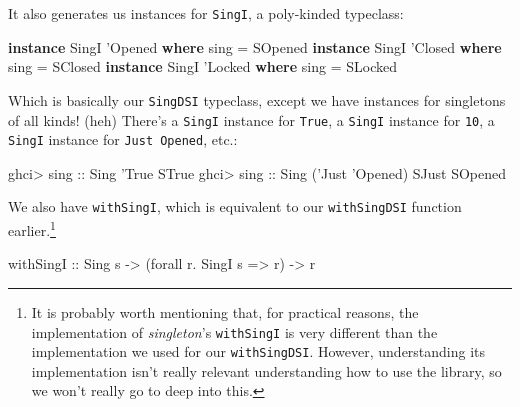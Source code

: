 \documentclass[]{article}
\newenvironment{Shaded}{}{}
\newcommand{\DataTypeTok}[1]{\textcolor[rgb]{0.56,0.13,0.00}{#1}}
\newcommand{\FunctionTok}[1]{\textcolor[rgb]{0.02,0.16,0.49}{#1}}
\newcommand{\KeywordTok}[1]{\textcolor[rgb]{0.00,0.44,0.13}{\textbf{#1}}}
\newcommand{\NormalTok}[1]{#1}
\newcommand{\OtherTok}[1]{\textcolor[rgb]{0.00,0.44,0.13}{#1}}
\begin{document}
It also generates us instances for \texttt{SingI}, a poly-kinded typeclass:

\begin{Shaded}
\begin{Highlighting}[]
\KeywordTok{instance} \DataTypeTok{SingI}\NormalTok{ '}\DataTypeTok{Opened} \KeywordTok{where}
\NormalTok{    sing }\FunctionTok{=} \DataTypeTok{SOpened}
\KeywordTok{instance} \DataTypeTok{SingI}\NormalTok{ '}\DataTypeTok{Closed} \KeywordTok{where}
\NormalTok{    sing }\FunctionTok{=} \DataTypeTok{SClosed}
\KeywordTok{instance} \DataTypeTok{SingI}\NormalTok{ '}\DataTypeTok{Locked} \KeywordTok{where}
\NormalTok{    sing }\FunctionTok{=} \DataTypeTok{SLocked}
\end{Highlighting}
\end{Shaded}

Which is basically our \texttt{SingDSI} typeclass, except we have instances for
singletons of all kinds! (heh) There's a \texttt{SingI} instance for
\texttt{\textquotesingle{}True}, a \texttt{SingI} instance for \texttt{10}, a
\texttt{SingI} instance for
\texttt{\textquotesingle{}Just\ \textquotesingle{}Opened}, etc.:

\begin{Shaded}
\begin{Highlighting}[]
\NormalTok{ghci}\FunctionTok{>}\OtherTok{ sing ::} \DataTypeTok{Sing}\NormalTok{ '}\DataTypeTok{True}
\DataTypeTok{STrue}
\NormalTok{ghci}\FunctionTok{>}\OtherTok{ sing ::} \DataTypeTok{Sing}\NormalTok{ ('}\DataTypeTok{Just}\NormalTok{ '}\DataTypeTok{Opened}\NormalTok{)}
\DataTypeTok{SJust} \DataTypeTok{SOpened}
\end{Highlighting}
\end{Shaded}

We also have \texttt{withSingI}, which is equivalent to our \texttt{withSingDSI}
function earlier.\footnote{It is probably worth mentioning that, for practical
  reasons, the implementation of \emph{singleton}'s \texttt{withSingI} is very
  different than the implementation we used for our \texttt{withSingDSI}.
  However, understanding its implementation isn't really relevant understanding
  how to use the library, so we won't really go to deep into this.}

\begin{Shaded}
\begin{Highlighting}[]
\OtherTok{withSingI ::} \DataTypeTok{Sing}\NormalTok{ s }\OtherTok{->}\NormalTok{ (forall r}\FunctionTok{.} \DataTypeTok{SingI}\NormalTok{ s }\OtherTok{=>}\NormalTok{ r) }\OtherTok{->}\NormalTok{ r}
\end{Highlighting}
\end{Shaded}
\end{document}
